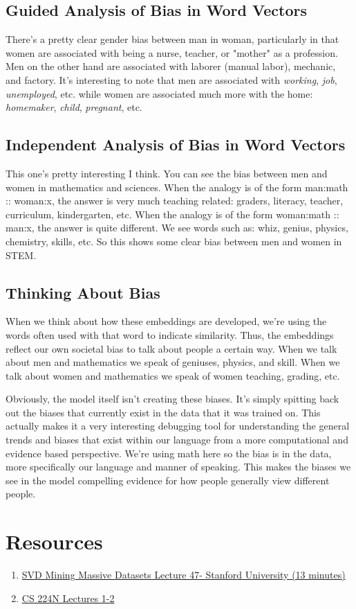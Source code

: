 \documentclass[12pt]{article}
\begin{document}
\subsection{Guided Analysis of Bias in Word Vectors}
There's a pretty clear gender bias between man in woman, particularly in that women are associated
with being a nurse, teacher, or "mother" as a profession. Men on the other hand are associated 
with laborer (manual labor), mechanic, and factory. It's interesting to note that men are associated 
with \emph{working}, \emph{job}, \emph{unemployed}, etc. while women are associated much more 
with the home: \emph{homemaker}, \emph{child}, \emph{pregnant}, etc. 

\subsection{Independent Analysis of Bias in Word Vectors}
This one's pretty interesting I think. You can see the bias between men and women in mathematics 
and sciences. When the analogy is of the form man:math :: woman:x, the answer is very much 
teaching related: graders, literacy, teacher, curriculum, kindergarten, etc. When the analogy is 
of the form woman:math :: man:x, the answer is quite different. We see words such as: whiz, genius, 
physics, chemistry, skills, etc. So this shows some clear bias between men and women in STEM. 

\subsection{Thinking About Bias}
When we think about how these embeddings are developed, we're using the words often used with that
word to indicate similarity. Thus, the embeddings reflect our own societal bias to talk about people
a certain way. When we talk about men and mathematics we speak of geniuses, physics, and skill. When 
we talk about women and mathematics we speak of women teaching, grading, etc.

Obviously, the model itself isn't creating these biases. It's simply spitting back out the biases 
that currently exist in the data that it was trained on. This actually makes it a very interesting 
debugging tool for understanding the general trends and biases that exist within our language from 
a more computational and evidence based perspective. We're using math here so the bias is in the data, 
more specifically our language and manner of speaking. This makes the biases we see in the model 
compelling evidence for how people generally view different people. 

\section{Resources}
\begin{enumerate}
    \item \href{https://www.youtube.com/watch?v=P5mlg91as1c}{SVD Mining Massive Datasets Lecture 47- Stanford University (13 minutes)}
    \item \href{https://web.stanford.edu/class/cs224n/}{CS 224N Lectures 1-2}
\end{enumerate}
\end{document}
